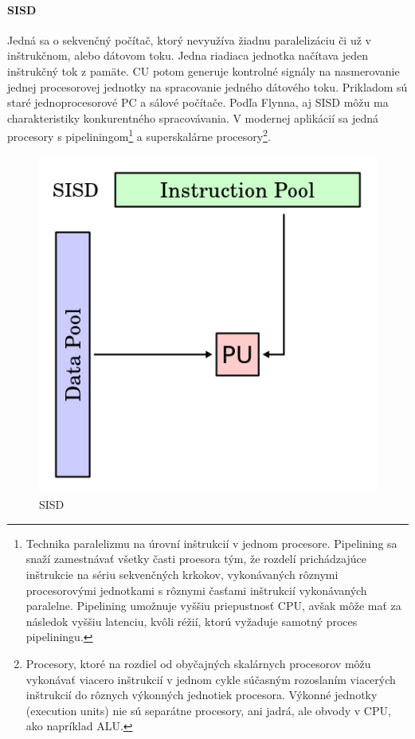 \documentclass[11pt,a4paper]{report}
\begin{document}
\paragraph{SISD} Jedná sa o sekvenčný počítač, ktorý nevyužíva žiadnu paralelizáciu či už v inštrukčnom, alebo dátovom toku. Jedna riadiaca jednotka načítava jeden inštrukčný tok z pamäte. CU potom generuje kontrolné signály na nasmerovanie jednej procesorovej jednotky na spracovanie jedného dátového toku. Prikladom sú staré jednoprocesorové PC a sálové počítače. Podľa Flynna, aj SISD môžu ma charakteristiky konkurentného spracovávania. V modernej aplikácií sa jedná procesory s pipeliningom\footnote{Technika paralelizmu na úrovní inštrukcií v jednom procesore. Pipelining sa snaží zamestnávať všetky časti proesora tým, že rozdelí prichádzajúce inštrukcie na sériu sekvenčných krkokov, vykonávaných rôznymi procesorovými jednotkami s rôznymi časťami inštrukcií vykonávaných paralelne. Pipelining umožnuje vyššiu priepustnosť CPU, avšak môže mať za následok vyššiu latenciu, kvôli réžií, ktorú vyžaduje samotný proces pipeliningu.} a superskalárne procesory\footnote{Procesory, ktoré na rozdiel od obyčajných skalárnych procesorov môžu vykonávať viacero inštrukcií v jednom cykle súčasným rozoslaním viacerých inštrukcií do rôznych výkonných jednotiek procesora. Výkonné jednotky (execution units) nie sú separátne procesory, ani jadrá, ale obvody v CPU, ako napríklad ALU.}.

\begin{figure}[ht]
        \centering
        \includegraphics[scale=0.4]{images/SISD}
        \caption{SISD}
        \label{SISD:}
\end{figure}
\end{document}
